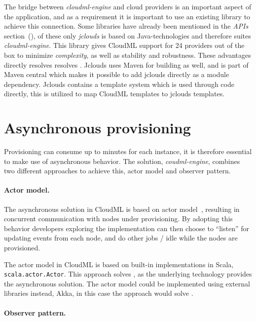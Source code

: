 The bridge between \emph{cloudml-engine} and cloud providers is an important aspect of the application, 
and as a requirement it is important to use an existing library to achieve this connection.
Some libraries have already been mentioned in the \emph{APIs} section~(),
of these only \emph{jclouds} is based on Java-technologies and therefore suites \emph{cloudml-engine}.
This library gives CloudML support for 24 providers out of the box to minimize \emph{complexity},
as well as stability and robustness.
These advantages directly resolves resolves .
Jclouds uses Maven for building as well, and is part of Maven central which makes 
it possible to add jclouds directly as a module dependency.
Jclouds contains a template system which is used through code directly, this is utilized 
to map CloudML templates to jclouds templates.



\section{Asynchronous provisioning}

Provisioning can consume up to minutes for each instance,
it is therefore essential to make use of asynchronous behavior.
The solution, \emph{coudml-engine}, combines two different approaches to achieve this,
actor model and observer pattern.

\paragraph{Actor model.}

The asynchronous solution in CloudML is based on actor model~\cite{actors:haller07},
resulting in concurrent communication with nodes under provisioning.
By adopting this behavior developers exploring the implementation can then choose
to ``listen'' for updating events from each node,
and do other jobs / idle while the nodes are provisioned.

The actor model in CloudML is based on built-in implementations in Scala, 
\texttt{scala.actor.Actor}.
This approach solves ,
as the underlying technology provides the asynchronous solution.
The actor model could be implemented using external libraries instead,
\eg Akka,
in this case the approach would solve .

\paragraph{Observer pattern.}

